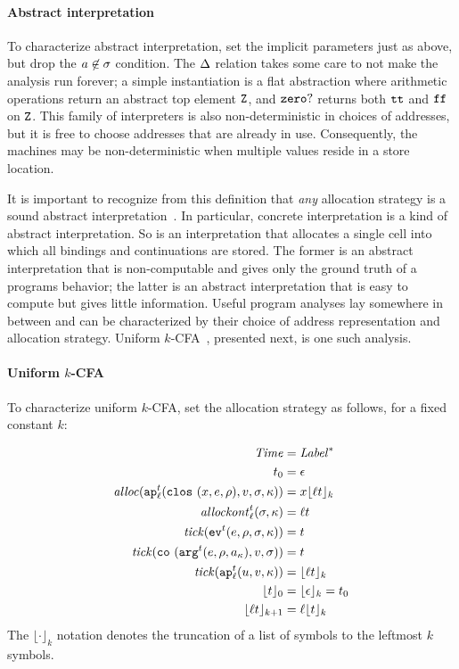 \documentclass[preprint,onecolumn,9pt]{sigplanconf} %
\begin{document}
\paragraph{Abstract interpretation} To characterize abstract
interpretation, set the implicit parameters just as above, but drop
the $\maddr \not\in \msto$ condition. The $\interpdelta$ relation takes some care
to not make the analysis run forever; a simple instantiation is a flat
abstraction where arithmetic operations return an abstract top element
$\sNum$, and $\szerohuh$ returns both $\strue$ and $\sfalse$ on
$\sNum$.  This family of interpreters is also non-deterministic in
choices of addresses, but it is free to choose addresses that are
already in use.  Consequently, the machines may be non-deterministic
when multiple values reside in a store location.

It is important to recognize from this definition that \emph{any}
allocation strategy is a sound abstract
interpretation~\cite{dvanhorn:Might2009Posteriori}.  In particular,
concrete interpretation is a kind of abstract interpretation.  So is
an interpretation that allocates a single cell into which all bindings
and continuations are stored.  The former is an abstract
interpretation that is non-computable and gives only the ground truth
of a programs behavior; the latter is an abstract interpretation
that is easy to compute but gives little information.  Useful program
analyses lay somewhere in between and can be characterized by their
choice of address representation and allocation strategy.  Uniform
\(k\)-CFA~\cite{dvanhorn:nielson-nielson-popl97}, presented next, is one such analysis.

\paragraph{Uniform \(k\)-CFA} To characterize uniform \(k\)-CFA, set the allocation
strategy as follows, for a fixed constant \(k\):

{\small
\begin{align*}
\Counter &= \Label^* \\
\mtcntr &= \epsilon \\
\alloc(\ap[^\mcntr_\mlab]{\clos{\mvar,\mexp,\menv},\mval,\msto,\mkont}) &= \mvar\kpush[_k]{\mlab\mcntr} \\
\allockont^\mcntr_\mlab(\msto,\mkont) &= \mlab\mcntr \\
\tick(\ev[^\mcntr]{\mexp,\menv,\msto,\mkont}) &= \mcntr \\
\tick(\co{\kar[^\mcntr]{\mexp,\menv,\mkaddr},\mval,\msto}) &= \mcntr \\
\tick(\ap[^\mcntr_\mlab]{\mvalx{u},\mval,\mkont}) &= \kpush[_k]{\mlab\mcntr} \\
  \kpush[_0]{\mcntr} &= \kpush[_k]{\epsilon} = \mtcntr \\
  \kpush[_{k+1}]{\mlab\mcntr} &= \mlab\kpush[_k]{\mcntr} \\
\end{align*}}
The \(\lfloor\cdot\rfloor_k\) notation denotes the truncation of a list
of symbols to the leftmost \(k\) symbols.
\end{document}

